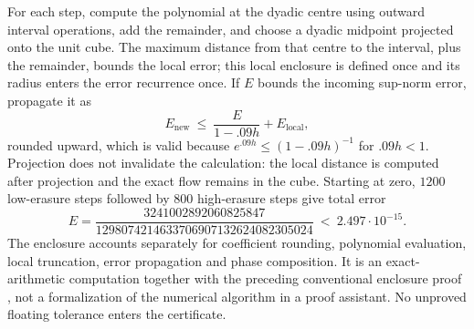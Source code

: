 For each step, compute the polynomial at the dyadic centre using outward
interval operations, add the remainder, and choose a dyadic midpoint projected
onto the unit cube. The maximum distance from that centre to the interval, plus
the remainder, bounds the local error; this local enclosure is defined once and
its radius enters the error recurrence once. If $E$ bounds the incoming sup-norm
error, propagate it as
\[
 E_{\mathrm{new}}\ \le\ \frac{E}{1-.09h}+E_{\mathrm{local}},
\]
rounded upward, which is valid because $e^{.09h}\le(1-.09h)^{-1}$ for
$.09h<1$. Projection does not invalidate the calculation: the local distance is
computed after projection and the exact flow remains in the cube. Starting at
zero, $1200$ low-erasure steps followed by $800$ high-erasure steps give total
error
\[
 E=\frac{3241002892060825847}{1298074214633706907132624082305024}
 \ <\ 2.497\cdot10^{-15}.
\]
The enclosure accounts separately for coefficient rounding, polynomial
evaluation, local truncation, error propagation and phase composition. It is an
exact-arithmetic computation together with the preceding conventional enclosure
proof \citep{nedialkov1999}, not a formalization of the numerical algorithm in a
proof assistant. No unproved floating tolerance enters the certificate.
